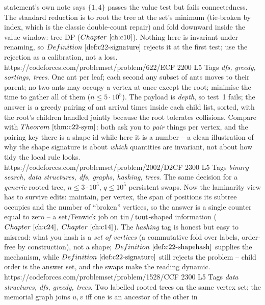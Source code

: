 \begin{mixedset}
{     statement's own note says \(\{1,4\}\) passes the value test but fails connectedness.
     The standard reduction is to root the tree at the set's minimum (tie-broken by index,
     which is the classic double-count repair) and fold downward inside the value window:
     tree DP (\(\chref{c10}\)). Nothing here is invariant under renaming, so
     \(\defref{c22-signature}\) rejects it at the first test; use the rejection as a
     calibration, not a loss.}
    {https://codeforces.com/problemset/problem/622/E}{CF 2200 L5}
    {Tags \emph{dfs, greedy, sortings, trees}. One ant per leaf; each second any subset of
     ants moves to their parent; no two ants may occupy a vertex at once except the root;
     minimise the time to gather all of them (\(n\le 5\cdot10^5\)). The payload is
     \emph{depth}, so test~1 fails; the answer is a greedy pairing of ant arrival times
     inside each child list, sorted, with the root's children handled jointly because the
     root tolerates collisions. Compare with \(\thmref{c22-sym}\): both ask you to
     \emph{pair} things per vertex, and the pairing key there is a shape id while here it is
     a number -- a clean illustration of why the shape signature is about \emph{which}
     quantities are invariant, not about how tidy the local rule looks.}
    {https://codeforces.com/problemset/problem/2002/D2}{CF 2300 L5}
    {Tags \emph{binary search, data structures, dfs, graphs, hashing, trees}. The same
     decision for a \emph{generic} rooted tree, \(n\le 3\cdot10^5\), \(q\le 10^5\)
     persistent swaps. Now the laminarity view has to survive edits: maintain, per vertex,
     the span of positions its subtree occupies and the number of ``broken'' vertices, so
     the answer is a single counter equal to zero -- a set/Fenwick job on
     \(\operatorname{tin}/\operatorname{tout}\)-shaped information (\(\chref{c24}\), \(\chref{c14}\)). The
     \emph{hashing} tag is honest but easy to misread: what you hash is a \emph{set of
     vertices} (a commutative fold over labels, order-free by construction), not a shape;
     \(\defref{c22-shapehash}\) supplies the mechanism, while \(\defref{c22-signature}\)
     still rejects the problem -- child order is the answer set, and the swaps make the
     reading dynamic.}
    {https://codeforces.com/problemset/problem/1528/C}{CF 2300 L5}
    {Tags \emph{data structures, dfs, greedy, trees}. Two labelled rooted trees on the same
     vertex set; the memorial graph joins \(u,v\) iff one is an ancestor of the other in
}
\end{mixedset}
